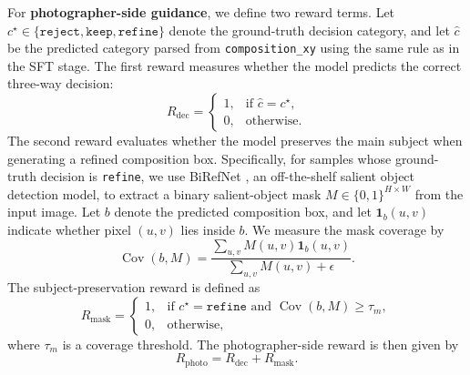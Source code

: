 \documentclass{llmxive}
\begin{document}
For \textbf{photographer-side guidance}, we define two reward terms. Let $c^\star \in \{\texttt{reject}, \texttt{keep}, \texttt{refine}\}$ denote the ground-truth decision category, and let $\hat{c}$ be the predicted category parsed from \texttt{composition\_xy} using the same rule as in the SFT stage. The first reward measures whether the model predicts the correct three-way decision:
\begin{equation}
R_{\text{dec}} =
\begin{cases}
1, & \text{if } \hat{c} = c^\star, \\
0, & \text{otherwise}.
\end{cases}
\end{equation}
The second reward evaluates whether the model preserves the main subject when generating a refined composition box. Specifically, for samples whose ground-truth decision is \texttt{refine}, we use BiRefNet \citep{zheng2024bilateral}, an off-the-shelf salient object detection model, to extract a binary salient-object mask $M \in \{0,1\}^{H \times W}$ from the input image. Let $b$ denote the predicted composition box, and let $\mathbf{1}_{b}(u,v)$ indicate whether pixel $(u,v)$ lies inside $b$. We measure the mask coverage by
\begin{equation}
\operatorname{Cov}(b,M) =
\frac{\sum_{u,v} M(u,v)\mathbf{1}_{b}(u,v)}
{\sum_{u,v} M(u,v) + \epsilon}.
\end{equation}
The subject-preservation reward is defined as
\begin{equation}
R_{\text{mask}} =
\begin{cases}
1, & \text{if } c^\star = \texttt{refine} \text{ and } \operatorname{Cov}(b,M) \ge \tau_m, \\
0, & \text{otherwise},
\end{cases}
\end{equation}
where $\tau_m$ is a coverage threshold. The photographer-side reward is then given by
\begin{equation}
R_{\text{photo}} = R_{\text{dec}} + R_{\text{mask}}.
\end{equation}
\end{document}

